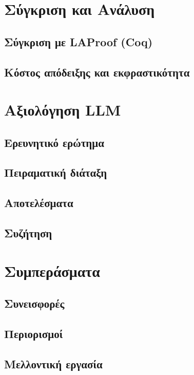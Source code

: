 \documentclass[a4paper,12pt]{article}
\begin{document}
\section{Σύγκριση και Ανάλυση}
\subsection{Σύγκριση με LAProof (Coq)}
\subsection{Κόστος απόδειξης και εκφραστικότητα}

\section{Αξιολόγηση LLM}
\subsection{Ερευνητικό ερώτημα}
\subsection{Πειραματική διάταξη}
\subsection{Αποτελέσματα}
\subsection{Συζήτηση}

\section{Συμπεράσματα}
\subsection{Συνεισφορές}
\subsection{Περιορισμοί}
\subsection{Μελλοντική εργασία}

\newpage
\renewcommand{\refname}{Βιβλιογραφία}

\nocite{*}

\end{document}
